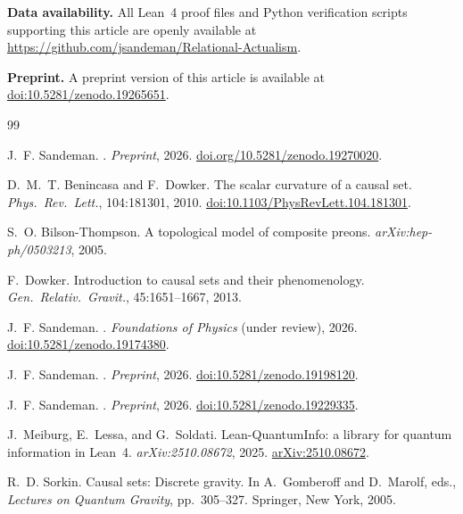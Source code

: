 \documentclass[11pt,a4paper]{article}
\begin{document}
\smallskip\noindent
\textbf{Data availability.}
All Lean~4 proof files and Python verification scripts supporting this
article are openly available at
\url{https://github.com/jsandeman/Relational-Actualism}.

\smallskip\noindent
\textbf{Preprint.}
A preprint version of this article is available at
\href{https://doi.org/10.5281/zenodo.19265651}{doi:10.5281/zenodo.19265651}.

\begin{thebibliography}{99}

J.~F. Sandeman.
.
\newblock \textit{Preprint}, 2026.
\newblock \href{https://doi.org/10.5281/zenodo.19270020}{doi.org/10.5281/zenodo.19270020}.


D.~M.~T. Benincasa and F.~Dowker.
\newblock The scalar curvature of a causal set.
\newblock \textit{Phys.\ Rev.\ Lett.}, 104:181301, 2010.
\newblock \href{https://doi.org/10.1103/PhysRevLett.104.181301}{doi:10.1103/PhysRevLett.104.181301}.

S.~O. Bilson-Thompson.
\newblock A topological model of composite preons.
\newblock \textit{arXiv:hep-ph/0503213}, 2005.

F.~Dowker.
\newblock Introduction to causal sets and their phenomenology.
\newblock \textit{Gen.\ Relativ.\ Gravit.}, 45:1651--1667, 2013.

J.~F. Sandeman.
.
\newblock \textit{Foundations of Physics} (under review), 2026.
\newblock \href{https://doi.org/10.5281/zenodo.19174380}{doi:10.5281/zenodo.19174380}.

J.~F. Sandeman.
.
\newblock \textit{Preprint}, 2026.
\newblock \href{https://doi.org/10.5281/zenodo.19198120}{doi:10.5281/zenodo.19198120}.

J.~F. Sandeman.
.
\newblock \textit{Preprint}, 2026.
\newblock \href{https://doi.org/10.5281/zenodo.19229335}{doi:10.5281/zenodo.19229335}.

J.~Meiburg, E.~Lessa, and G.~Soldati.
\newblock Lean-QuantumInfo: a library for quantum information in Lean~4.
\newblock \textit{arXiv:2510.08672}, 2025.
\newblock \href{https://arxiv.org/abs/2510.08672}{arXiv:2510.08672}.

R.~D. Sorkin.
\newblock Causal sets: Discrete gravity.
\newblock In A.~Gomberoff and D.~Marolf, eds., \textit{Lectures on Quantum Gravity},
pp.\ 305--327. Springer, New York, 2005.

\end{thebibliography}
\end{document}
